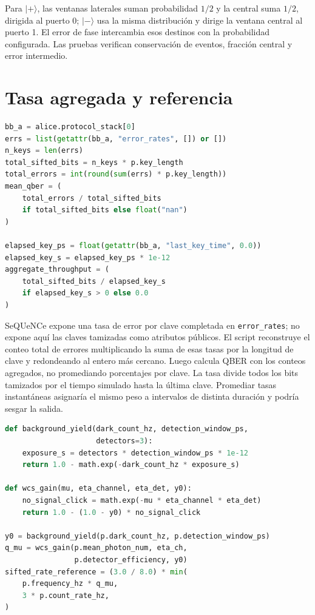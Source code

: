 Para \(\lvert+\rangle\), las ventanas laterales suman probabilidad \(1/2\) y la central suma \(1/2\), dirigida al puerto 0; \(\lvert-\rangle\) usa la misma distribución y dirige la ventana central al puerto 1. El error de fase intercambia esos destinos con la probabilidad configurada. Las pruebas verifican conservación de eventos, fracción central y error intermedio.

\section{Tasa agregada y referencia}

\begin{lstlisting}[language=Python, caption={Cálculo de la tasa tamizada de una repetición.}]
bb_a = alice.protocol_stack[0]
errs = list(getattr(bb_a, "error_rates", []) or [])
n_keys = len(errs)
total_sifted_bits = n_keys * p.key_length
total_errors = int(round(sum(errs) * p.key_length))
mean_qber = (
    total_errors / total_sifted_bits
    if total_sifted_bits else float("nan")
)

elapsed_key_ps = float(getattr(bb_a, "last_key_time", 0.0))
elapsed_key_s = elapsed_key_ps * 1e-12
aggregate_throughput = (
    total_sifted_bits / elapsed_key_s
    if elapsed_key_s > 0 else 0.0
)
\end{lstlisting}

SeQUeNCe expone una tasa de error por clave completada en \texttt{error\_rates}; no expone aquí las claves tamizadas como atributos públicos. El script reconstruye el conteo total de errores multiplicando la suma de esas tasas por la longitud de clave y redondeando al entero más cercano. Luego calcula QBER con los conteos agregados, no promediando porcentajes por clave. La tasa divide todos los bits tamizados por el tiempo simulado hasta la última clave. Promediar tasas instantáneas asignaría el mismo peso a intervalos de distinta duración y podría sesgar la salida.

\begin{lstlisting}[language=Python, caption={Fondo, ganancia y referencia de clics tamizados.}]
def background_yield(dark_count_hz, detection_window_ps,
                     detectors=3):
    exposure_s = detectors * detection_window_ps * 1e-12
    return 1.0 - math.exp(-dark_count_hz * exposure_s)

def wcs_gain(mu, eta_channel, eta_det, y0):
    no_signal_click = math.exp(-mu * eta_channel * eta_det)
    return 1.0 - (1.0 - y0) * no_signal_click

y0 = background_yield(p.dark_count_hz, p.detection_window_ps)
q_mu = wcs_gain(p.mean_photon_num, eta_ch,
                p.detector_efficiency, y0)
sifted_rate_reference = (3.0 / 8.0) * min(
    p.frequency_hz * q_mu,
    3 * p.count_rate_hz,
)
\end{lstlisting}

